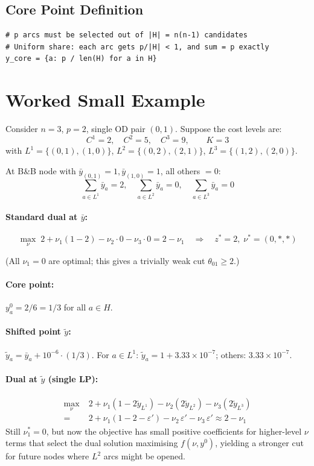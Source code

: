 \documentclass[12pt,a4paper]{article}
\begin{document}
\subsection{Core Point Definition}

\begin{lstlisting}[caption={Core point: uniform interior of feasible region}]
# p arcs must be selected out of |H| = n(n-1) candidates
# Uniform share: each arc gets p/|H| < 1, and sum = p exactly
y_core = {a: p / len(H) for a in H}
\end{lstlisting}

\section{Worked Small Example}

Consider $n=3$, $p=2$, single OD pair $(0,1)$. Suppose the cost levels are:
$$C^1 = 2,\quad C^2 = 5,\quad C^3 = 9, \qquad K=3$$
with $L^1=\{(0,1),(1,0)\}$, $L^2=\{(0,2),(2,1)\}$, $L^3=\{(1,2),(2,0)\}$.

At B\&B node with $\bar{y}_{(0,1)}=1, \bar{y}_{(1,0)}=1$, all others $=0$:
$$\sum_{a\in L^1}\bar{y}_a = 2, \quad \sum_{a\in L^2}\bar{y}_a = 0, \quad \sum_{a\in L^3}\bar{y}_a = 0$$

\paragraph{Standard dual at $\bar{y}$:}
$$\max_\nu\; 2 + \nu_1(1-2) - \nu_2\cdot 0 - \nu_3 \cdot 0
= 2 - \nu_1 \quad\Rightarrow\quad z^* = 2, \;\nu^* = (0, *, *)$$

(All $\nu_1 = 0$ are optimal; this gives a trivially weak cut $\theta_{01}\ge 2$.)

\paragraph{Core point:} $y^0_a = 2/6 = 1/3$ for all $a \in H$.

\paragraph{Shifted point $\tilde{y}$:} $\tilde{y}_a = \bar{y}_a + 10^{-6}\cdot(1/3)$. For $a\in L^1$: $\tilde{y}_a = 1 + 3.33\times10^{-7}$; others: $3.33\times10^{-7}$.

\paragraph{Dual at $\tilde{y}$ (single LP):}
\begin{align*}
\max_\nu\; &2 + \nu_1(1 - 2\tilde{y}_{L^1}) - \nu_2(2\tilde{y}_{L^2}) - \nu_3(2\tilde{y}_{L^3})\\
=\; &2 + \nu_1(1 - 2 - \varepsilon') - \nu_2\,\varepsilon' - \nu_3\,\varepsilon'
\approx 2 - \nu_1
\end{align*}
Still $\nu^*_1 = 0$, but now the objective has small positive coefficients for
higher-level $\nu$ terms that select the dual solution maximising $f(\nu, y^0)$,
yielding a stronger cut for future nodes where $L^2$ arcs might be opened.
\end{document}
